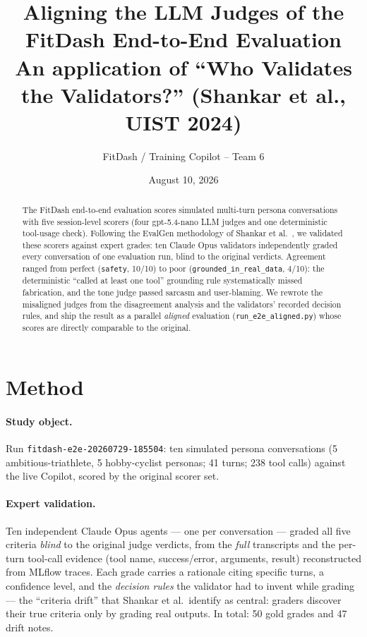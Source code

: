 \documentclass[11pt,a4paper]{article}
\title{Aligning the LLM Judges of the FitDash End-to-End Evaluation\\
\large An application of ``Who Validates the Validators?'' (Shankar et al., UIST 2024)}
\author{FitDash / Training Copilot -- Team 6}
\date{August 10, 2026}
\newcommand{\scorer}[1]{\texttt{\small #1}}
\begin{document}
\maketitle

\begin{abstract}
The FitDash end-to-end evaluation scores simulated multi-turn persona
conversations with five session-level scorers (four \mbox{gpt-5.4-nano} LLM
judges and one deterministic tool-usage check). Following the EvalGen
methodology of Shankar et al.~\cite{shankar2024}, we validated these scorers
against expert grades: ten Claude Opus validators independently graded every
conversation of one evaluation run, blind to the original verdicts. Agreement
ranged from perfect (\scorer{safety}, 10/10) to poor
(\scorer{grounded\_in\_real\_data}, 4/10): the deterministic ``called at least
one tool'' grounding rule systematically missed fabrication, and the tone judge
passed sarcasm and user-blaming. We rewrote the misaligned judges from the
disagreement analysis and the validators' recorded decision rules, and ship the
result as a parallel \emph{aligned} evaluation (\texttt{run\_e2e\_aligned.py})
whose scores are directly comparable to the original.
\end{abstract}

\section{Method}

\paragraph{Study object.} Run \texttt{fitdash-e2e-20260729-185504}: ten
simulated persona conversations (5 ambitious-triathlete, 5 hobby-cyclist
personas; 41 turns; 238 tool calls) against the live Copilot, scored by the
original scorer set.

\paragraph{Expert validation.} Ten independent Claude Opus agents --- one per
conversation --- graded all five criteria \emph{blind} to the original judge
verdicts, from the \emph{full} transcripts and the per-turn tool-call evidence
(tool name, success/error, arguments, result) reconstructed from MLflow traces.
Each grade carries a rationale citing specific turns, a confidence level, and
the \emph{decision rules} the validator had to invent while grading --- the
``criteria drift'' that Shankar et al.\ identify as central: graders discover
their true criteria only by grading real outputs. In total: 50 gold grades and
47 drift notes.
\end{document}
